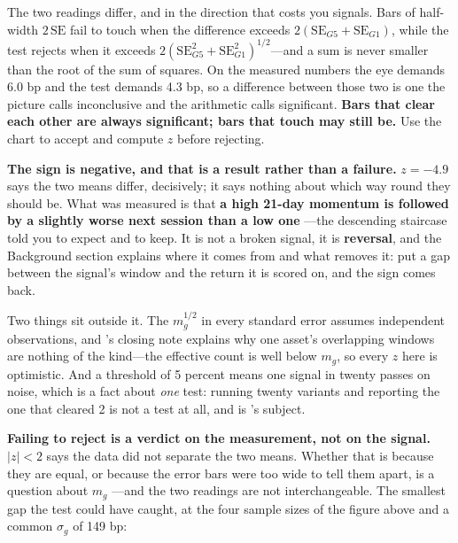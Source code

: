 \begin{note}
The two readings differ, and in the direction that costs you signals. Bars of half-width
$2\,\mathrm{SE}$ fail to touch when the difference exceeds
$2 \left( \mathrm{SE}_{G5} + \mathrm{SE}_{G1} \right)$, while the test rejects when it exceeds
$2 \left( \mathrm{SE}_{G5}^2 + \mathrm{SE}_{G1}^2 \right)^{1/2}$---and a sum is never smaller than
the root of the sum of squares. On the measured numbers the eye demands 6.0 bp and the test demands
4.3 bp, so a difference between those two is one the picture calls inconclusive and the arithmetic
calls significant. \textbf{Bars that clear each other are always significant; bars that touch may
still be.} Use the chart to accept and compute $z$ before rejecting.
\end{note}

\textbf{The sign is negative, and that is a result rather than a failure.} $z = -4.9$ says the two
means differ, decisively; it says nothing about which way round they should be. What was measured is
that \textbf{a high 21-day momentum is followed by a slightly worse next session than a low one}
---the descending staircase  told you to expect and to keep. It is not a
broken signal, it is \textbf{reversal}, and the Background section explains where it comes from and
what removes it: put a gap between the signal's window and the return it is scored on, and the sign
comes back.

\begin{note}
Two things sit outside it. The $m_g^{1/2}$ in every standard error assumes independent observations,
and 's closing note explains why one asset's overlapping windows are
nothing of the kind---the effective count is well below $m_g$, so every $z$ here is optimistic. And
a threshold of 5 percent means one signal in twenty passes on noise, which is a fact about
\emph{one} test: running twenty variants and reporting the one that cleared 2 is not a test at all,
and is 's subject.
\end{note}

\textbf{Failing to reject is a verdict on the measurement, not on the signal.}
$\left| z \right| < 2$ says the data did not separate the two means. Whether that is because they
are equal, or because the error bars were too wide to tell them apart, is a question about $m_g$
---and the two readings are not interchangeable. The smallest gap the test could have caught, at the
four sample sizes of the figure above and a common $\sigma_g$ of 149 bp:

